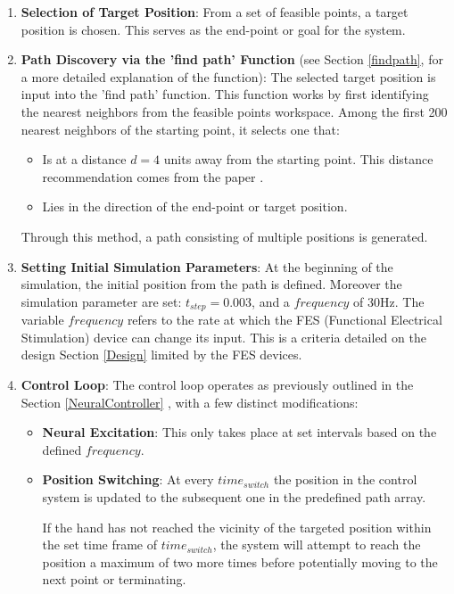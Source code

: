 \begin{enumerate}
    \item \textbf{Selection of Target Position}: From a set of feasible points, a target position is chosen. This serves as the end-point or goal for the system.
    
    \item \textbf{Path Discovery via the 'find path' Function} (see Section \ref{findpath}, for a more detailed explanation of the function): The selected target position is input into the 'find path' function. This function works by first identifying the nearest neighbors from the feasible points workspace. Among the first 200 nearest neighbors of the starting point, it selects one that:
    \begin{itemize}
        \item Is at a distance \(d = 4\) units away from the starting point. This distance recommendation comes from the paper \cite{QSC}.
        \item Lies in the direction of the end-point or target position.
    \end{itemize}
    Through this method, a path consisting of multiple positions is generated.
    
    \item \textbf{Setting Initial Simulation Parameters}: At the beginning of the simulation, the initial position from the path is defined. Moreover the simulation parameter are set: \(t_{step} = 0.003\), and a $frequency$ of 30Hz. The variable $frequency$ refers to the rate at which the FES (Functional Electrical Stimulation) device can change its input. This is a criteria detailed on the design Section \ref{Design} limited by the FES devices.
    
    \item \textbf{Control Loop}: The control loop operates as previously outlined in the Section \ref{NeuralController} , with a few distinct modifications:
    \begin{itemize}
        \item \textbf{Neural Excitation}: This only takes place at set intervals based on the defined $frequency$.
        \item \textbf{Position Switching}: At every $time_{switch}$ the position in the control system is updated to the subsequent one in the predefined path array.
        
        If the hand has not reached the vicinity of the targeted position within the set time frame of $time_{switch}$, the system will attempt to reach the position a maximum of two more times before potentially moving to the next point or terminating.
    \end{itemize}
\end{enumerate}

